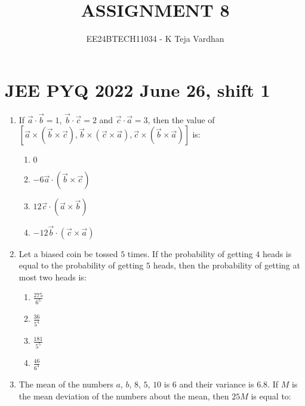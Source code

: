 \documentclass[journal]{IEEEtran}
\newcommand{\brak}[1]{\left( #1 \right)}
\newcommand{\sbrak}[1]{\left[ #1 \right]}
\begin{document}

\title{ASSIGNMENT 8}
\author{EE24BTECH11034 - K Teja Vardhan}
{\let\newpage\relax\maketitle}

\section{JEE PYQ 2022 June 26, shift 1}
\begin{enumerate}

   \item If $\vec{a}\cdot\vec{b}=1$, $\vec{b}\cdot\vec{c}=2$ and $\vec{c}\cdot\vec{a}=3$, then the value of $\sbrak{\vec{a}\times\brak{\vec{b}\times\vec{c}}, \vec{b}\times\brak{\vec{c}\times\vec{a}}, \vec{c}\times\brak{\vec{b}\times\vec{a}}}$ is:

        \begin{multicols}{4}
        \begin{enumerate}
        \item $0$
        \item $-6\vec{a}\cdot\brak{\vec{b}\times\vec{c}}$
        \item $12\vec{c}\cdot\brak{\vec{a}\times\vec{b}}$
        \item $-12\vec{b}\cdot\brak{\vec{c}\times\vec{a}}$
        \end{enumerate}
        \end{multicols} 

    \item Let a biased coin be tossed $5$ times. If the probability of getting $4$ heads is equal to the probability of getting $5$ heads, then the probability of getting at most two heads is:
        
        \begin{multicols}{4}
        \begin{enumerate}
        \item $\frac{275}{6^{5}}$
        \item $\frac{36}{5^{4}}$
        \item $\frac{181}{5^{5}}$
        \item $\frac{46}{6^{4}}$
        \end{enumerate}
        \end{multicols}
        
    
    \item The mean of the numbers $a$, $b$, $8$, $5$, $10$ is $6$ and their variance is $6.8$. If $M$ is the mean deviation of the numbers about the mean, then $25M$ is equal to:


\end{enumerate}
\end{document}
